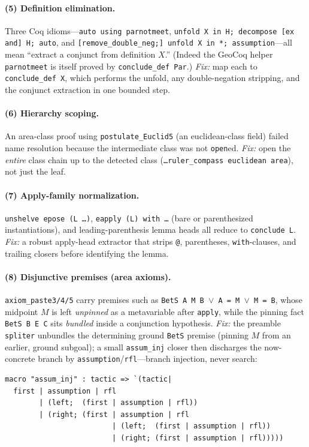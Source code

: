 \documentclass{article}
\begin{document}
\paragraph{(5) Definition elimination.} Three Coq idioms---\texttt{auto using parnotmeet},
\texttt{unfold X in H; decompose [ex and] H; auto}, and
\texttt{[remove\_double\_neg;] unfold X in *; assumption}---all mean ``extract a conjunct from
definition $X$.'' (Indeed the GeoCoq helper \texttt{parnotmeet} is itself proved by
\texttt{conclude\_def Par}.) \emph{Fix:} map each to \texttt{conclude\_def X}, which performs the
unfold, any double-negation stripping, and the conjunct extraction in one bounded step.

\paragraph{(6) Hierarchy scoping.} An \textsf{area}-class proof using \texttt{postulate\_Euclid5}
(an \textsf{euclidean}-class field) failed name resolution because the intermediate class was not
\texttt{open}ed. \emph{Fix:} open the \emph{entire} class chain up to the detected class
(\texttt{\ldots ruler\_compass euclidean area}), not just the leaf.

\paragraph{(7) Apply-family normalization.} \texttt{unshelve epose (L \ldots)},
\texttt{eapply (L) with \ldots} (bare or parenthesized instantiations), and leading-parenthesis
lemma heads all reduce to \texttt{conclude L}. \emph{Fix:} a robust apply-head extractor that
strips \texttt{@}, parentheses, \texttt{with}-clauses, and trailing closers before identifying
the lemma.

\paragraph{(8) Disjunctive premises (area axioms).} \texttt{axiom\_paste3/4/5} carry premises
such as \texttt{BetS A M B $\vee$ A = M $\vee$ M = B}, whose midpoint $M$ is left \emph{unpinned}
as a metavariable after \texttt{apply}, while the pinning fact \texttt{BetS B E C} sits
\emph{bundled} inside a conjunction hypothesis. \emph{Fix:} the preamble \texttt{spliter} unbundles
the determining ground \texttt{BetS} premise (pinning $M$ from an earlier, ground subgoal); a
small \texttt{assum\_inj} closer then discharges the now-concrete branch by
\texttt{assumption}/\texttt{rfl}---branch injection, never search:
\begin{lstlisting}
macro "assum_inj" : tactic => `(tactic|
  first | assumption | rfl
        | (left;  (first | assumption | rfl))
        | (right; (first | assumption | rfl
                         | (left;  (first | assumption | rfl))
                         | (right; (first | assumption | rfl)))))
\end{lstlisting}
\end{document}
